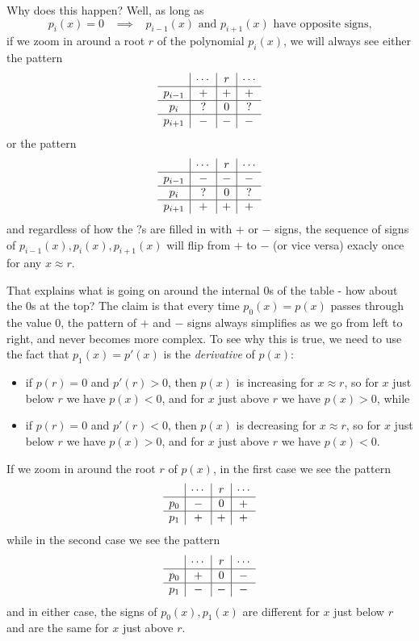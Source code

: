 Why does this happen? Well, as long as
\[
p_i(x) = 0 \;\;\; \implies \;\;\; p_{i-1}(x) \text{ and } p_{i+1}(x) \text{ have opposite signs,}
\]
if we zoom in around a root $r$ of the polynomial $p_i(x)$, we will always see either the pattern
\[
\begin{array}{c | c | c | c}
& \cdots & r & \cdots\\
\hline
p_{i-1} & + & + & +\\
\hline
p_i & ? & 0 & ?\\
\hline
p_{i+1} & - & - & -
\end{array}
\]
or the pattern
\[
\begin{array}{c | c | c | c}
& \cdots & r & \cdots\\
\hline
p_{i-1} & - & - & -\\
\hline
p_i & ? & 0 & ?\\
\hline
p_{i+1} & + & + & +
\end{array}
\]
and regardless of how the $?$s are filled in with $+$ or $-$ signs, the sequence of signs of $p_{i-1}(x), p_i(x), p_{i+1}(x)$ will flip from $+$ to $-$ (or vice versa) exacly once for any $x \approx r$.

That explains what is going on around the internal $0$s of the table - how about the $0$s at the top? The claim is that every time $p_0(x) = p(x)$ passes through the value $0$, the pattern of $+$ and $-$ signs always simplifies as we go from left to right, and never becomes more complex. To see why this is true, we need to use the fact that $p_1(x) = p'(x)$ is the \emph{derivative} of $p(x)$:
\begin{itemize}
\item if $p(r) = 0$ and $p'(r) > 0$, then $p(x)$ is increasing for $x \approx r$, so for $x$ just below $r$ we have $p(x) < 0$, and for $x$ just above $r$ we have $p(x) > 0$, while

\item if $p(r) = 0$ and $p'(r) < 0$, then $p(x)$ is decreasing for $x \approx r$, so for $x$ just below $r$ we have $p(x) > 0$, and for $x$ just above $r$ we have $p(x) < 0$.
\end{itemize}
If we zoom in around the root $r$ of $p(x)$, in the first case we see the pattern
\[
\begin{array}{c | c | c | c}
& \cdots & r & \cdots\\
\hline
p_0 & - & 0 & +\\
\hline
p_1 & + & + & +
\end{array}
\]
while in the second case we see the pattern
\[
\begin{array}{c | c | c | c}
& \cdots & r & \cdots\\
\hline
p_0 & + & 0 & -\\
\hline
p_1 & - & - & -
\end{array}
\]
and in either case, the signs of $p_0(x), p_1(x)$ are different for $x$ just below $r$ and are the same for $x$ just above $r$.

